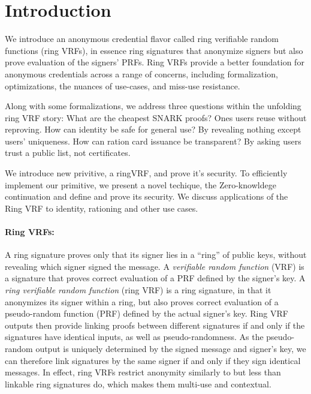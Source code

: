 \section{Introduction}

\def\qaudbreak{\eprint{\quad}{\\}}


We introduce an anonymous credential flavor called
ring verifiable random functions (ring VRFs),
in essence ring signatures that anonymize signers but
also prove evaluation of the signers' PRFs.
Ring VRFs provide a better foundation for anonymous credentials
across a range of concerns, including formalization, optimizations,
the nuances of use-cases, and miss-use resistance.

Along with some formalizations, we address three questions within
the unfolding ring VRF story:
What are the cheapest SNARK proofs?  Ones users reuse without reproving.
How can identity be safe for general use?  By revealing nothing except users' uniqueness.
How can ration card issuance be transparent?  By asking users trust a public list, not certificates.

We introduce new privitive, a ringVRF, and prove it's security. To efficiently implement our primitive, we present a novel techique, the Zero-knowldege continuation and define and prove its security. We discuss applications of the Ring VRF to identity, rationing and other use cases.



\paragraph{Ring VRFs:}

A ring signature \cite{ring_accountable,ring_efficient,ring_linkable,ring_noRO,ring_sublinear} proves only that its  signer lies in a ``ring''
of public keys, without revealing which signer  signed the message.
A {\it verifiable random function} (VRF) is a signature that proves
correct evaluation of a PRF defined by the signer's key.
A {\it ring verifiable random function} (ring VRF) is a ring signature, in
that it anonymizes its  signer within a ring,
but also proves correct evaluation of a pseudo-random function (PRF)
defined by the actual signer's key. %
%
Ring VRF outputs then provide linking proofs between different signatures
if and only if  the signatures have identical inputs, as well as pseudo-randomness.
As the pseudo-random output is uniquely determined by the signed message
and signer's  key, we can therefore link signatures by the
same signer if and only if they sign identical messages.
In effect, ring VRFs restrict anonymity similarly to but less than
linkable ring signatures \cite{ring_linkable,ring_linkablee}  do, which makes them multi-use and contextual.


